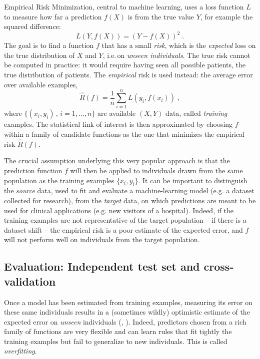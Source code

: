 \documentclass[a4paper,num-refs]{oup-contemporary}
\newcommand{\ie}{i.e.\,}
\begin{document}
Empirical Risk Minimization, central to machine learning,
uses a loss function $L$ to measure how far a
prediction $f(X)$ is from the true value $Y$, for example the squared
difference:
%
\begin{equation}
  L(Y, f(X)) = (Y - f(X))^2 \; .
\end{equation}
%
The goal is to find a function $f$ that has
 a small \emph{risk}, which is the \emph{expected} loss on
the true distribution of \(X\) and \(Y\), \ie on \emph{unseen individuals}.
The true risk cannot be computed in practice: it would require having seen all
possible patients, the true distribution of patients.
The \emph{empirical} risk is used instead: the average error over available
examples,
\begin{equation}
  \hat{R}(f) = \frac{1}{n}\sum_{i=1}^n L(y_i, f(x_i)) \; ,
\end{equation}
where $\{(x_i, y_i)\,,\,i=1,\dots,n\}$ are available $(X, Y)$ data,
called \emph{training} examples.
%
The statistical link of interest is then approximated by choosing $f$
 within a family of candidate functions as
the one that minimizes the empirical risk \(\hat{R}(f)\).

The crucial assumption underlying this very popular approach is that the
prediction function $f$ will then be applied to individuals drawn from the same
population as the training examples $\{x_i, y_i\}$. It can be important
to distinguish the \emph{source} data, used to fit and evaluate a machine-learning model (e.g. a dataset
collected for research), from the \emph{target} data, on which
predictions are meant to be used for clinical applications (e.g. new visitors of a hospital).
Indeed, if the training
examples are not representative of the target population -- if there is a
dataset shift -- the empirical risk is a poor estimate of the expected error,
and $f$ will not perform well on individuals from the target population.
%

\subsection{Evaluation: Independent test set and cross-validation}
\label{sec:org87b9cec}
Once a model has been estimated from training examples, measuring its error
on these same individuals results in a (sometimes wildly) optimistic estimate of
the expected error on \emph{unseen} individuals (\citet[Sec.
7.4]{friedman2001elements}, \citet[Sec. 1, ``Association vs Prediction'']{poldrack2020establishment}).
%
Indeed, predictors chosen from a rich family of functions are very
flexible and can learn rules that fit tightly the training examples but fail
to generalize to new individuals. This is called \emph{overfitting}.
\end{document}
